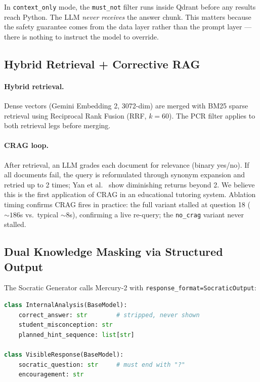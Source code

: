 \documentclass[11pt]{article}
\begin{document}
In \texttt{context\_only} mode, the \texttt{must\_not} filter runs inside
Qdrant before any results reach Python.
The LLM \emph{never receives} the answer chunk.
This matters because the safety guarantee comes from the data layer rather
than the prompt layer --- there is nothing to instruct the model to override.

\subsection{Hybrid Retrieval + Corrective RAG}

\paragraph{Hybrid retrieval.}
Dense vectors (Gemini Embedding 2, 3072-dim) are merged with BM25 sparse
retrieval using Reciprocal Rank Fusion (RRF, $k{=}60$).
The PCR filter applies to both retrieval legs before merging.

\paragraph{CRAG loop.}
After retrieval, an LLM grades each document for relevance (binary yes/no).
If all documents fail, the query is reformulated through synonym expansion and
retried up to 2 times; Yan et al.\ \cite{crag2024} show diminishing returns beyond 2.
We believe this is the first application of CRAG in an educational tutoring system.
Ablation timing confirms CRAG fires in practice: the full variant stalled at
question 18 (${\sim}186$s vs.\ typical ${\sim}8$s), confirming a live re-query;
the \texttt{no\_crag} variant never stalled.

\subsection{Dual Knowledge Masking via Structured Output}

The Socratic Generator calls Mercury-2 with
\texttt{response\_format=SocraticOutput}:

\begin{lstlisting}[language=Python]
class InternalAnalysis(BaseModel):
    correct_answer: str        # stripped, never shown
    student_misconception: str
    planned_hint_sequence: list[str]

class VisibleResponse(BaseModel):
    socratic_question: str     # must end with "?"
    encouragement: str
\end{lstlisting}
\end{document}
